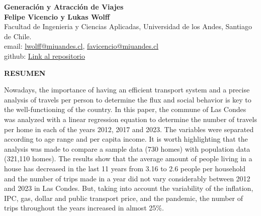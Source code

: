 \documentclass[12pt]{article} %
\begin{document}
\begin{titlepage}%
\newcommand{\HRule}{\rule{\linewidth}{0.5mm}} 
\center 
\begin{center}
    \textbf{\LARGE Generación y Atracción de Viajes} \\[0.5cm]
    \textbf{Felipe Vicencio y Lukas Wolff} \\
    Facultad de Ingenieria y Ciencias Aplicadas, Universidad de los Andes, Santiago de Chile.\\
    email: \href{mailto:lwolff@miuandes.cl}{lwolff@miuandes.cl}, \href{mailto:favicencio@miuandes.cl}{favicencio@miuandes.cl}
    \\
    github: \href{https://github.com/LukasWolff2002/TAREA_2_AUTITOS.git}{Link al repositorio}
\end{center}

\vspace{1cm}

\begin{center}
    \textbf{\large RESUMEN}    
\end{center}

\begin{justify}
    Nowadays, the importance of having an efficient transport 
    system and a precise analysis of travels per person to 
    determine the flux and social behavior is key to the 
    well-functioning of the country.  In this paper, the commune 
    of Las Condes was analyzed with a linear regression equation to 
    determine the number of travels per home in each of the years 2012, 
    2017 and 2023. The variables were separated according to age range 
    and per capita income. It is worth highlighting that the analysis 
    was made to compare a sample data (730 homes) with population data (321,110 homes). 
    The results show that the average amount of people living in a house has decreased 
    in the last 11 years from 3.16 to 2.6 people per household and the number of trips 
    made in a year did not vary considerably between 2012 and 2023 in Las Condes. 
    But, taking into account the variability of the inflation, IPC, gas, dollar and public transport price, 
    and the pandemic, the number of trips throughout the years increased in almost 25\%. 
\end{justify}


\vspace{1cm}

\end{titlepage}
\end{document}
